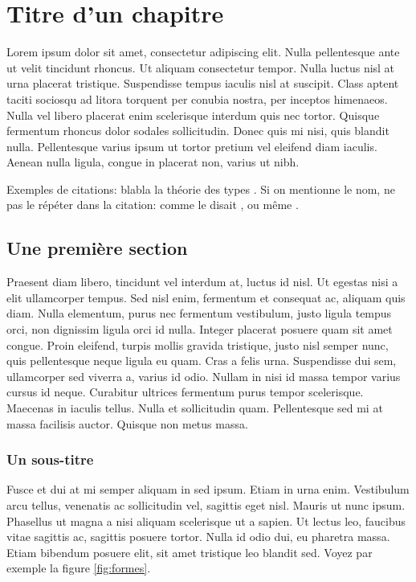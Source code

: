 \chapter{Titre d'un chapitre}

Lorem ipsum dolor sit amet, consectetur adipiscing elit. Nulla pellentesque
ante ut velit tincidunt rhoncus. Ut aliquam consectetur tempor. Nulla luctus
nisl at urna placerat tristique. Suspendisse tempus iaculis nisl at
suscipit. Class aptent taciti sociosqu ad litora torquent per conubia
nostra, per inceptos himenaeos. Nulla vel libero placerat enim scelerisque
interdum quis nec tortor. Quisque fermentum rhoncus dolor sodales
sollicitudin. Donec quis mi nisi, quis blandit nulla. Pellentesque varius
ipsum ut tortor pretium vel eleifend diam iaculis. Aenean nulla ligula,
congue in placerat non, varius ut nibh.

Exemples de citations: blabla la théorie des types
\citep{DBLPjournals/jsyml/Turing48,DBLPjournals/ai/Lenat82}. Si on mentionne
le nom, ne pas le répéter dans la citation: comme le disait
\citet{DBLPjournals/jsyml/Turing48}, ou même
\citet{DBLPconf/afips/SolomonP76}.

\section{Une première section}

Praesent diam libero, tincidunt vel interdum at, luctus id nisl. Ut egestas
nisi a elit ullamcorper tempus. Sed nisl enim, fermentum et consequat ac,
aliquam quis diam. Nulla elementum, purus nec fermentum vestibulum, justo
ligula tempus orci, non dignissim ligula orci id nulla. Integer placerat
posuere quam sit amet congue. Proin eleifend, turpis mollis gravida
tristique, justo nisl semper nunc, quis pellentesque neque ligula eu quam.
Cras a felis urna. Suspendisse dui sem, ullamcorper sed viverra a, varius id
odio. Nullam in nisi id massa tempor varius cursus id neque. Curabitur
ultrices fermentum purus tempor scelerisque. Maecenas in iaculis tellus.
Nulla et sollicitudin quam. Pellentesque sed mi at massa facilisis auctor.
Quisque non metus massa.

\subsection{Un sous-titre}

Fusce et dui at mi semper aliquam in sed ipsum. Etiam in urna enim.
Vestibulum arcu tellus, venenatis ac sollicitudin vel, sagittis eget nisl.
Mauris ut nunc ipsum. Phasellus ut magna a nisi aliquam scelerisque ut a
sapien. Ut lectus leo, faucibus vitae sagittis ac, sagittis posuere tortor.
Nulla id odio dui, eu pharetra massa. Etiam bibendum posuere elit, sit amet
tristique leo blandit sed. Voyez par exemple la figure \ref{fig:formes}.

